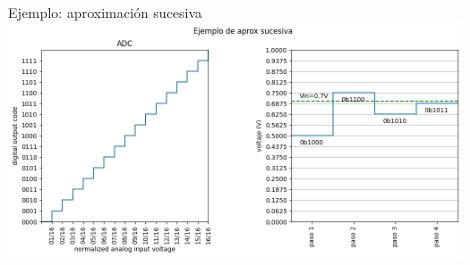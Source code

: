 \documentclass[aspectratio=169]{beamer}
\begin{document}
\begin{frame}{Ejemplo: aproximación sucesiva}
        \centering
        \includegraphics[width=0.9\textwidth]{presentaciones/fig/SARplots.png}
\end{frame}


% 
% 

\end{document}
